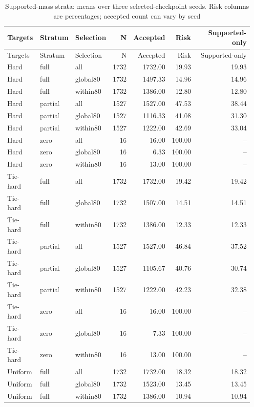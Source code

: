 \documentclass[10pt]{article}
\begin{document}
\begin{longtable}{lllrrrr}
\caption{Supported-mass strata: means over three selected-checkpoint seeds. Risk columns are percentages; accepted count can vary by seed}\\
\toprule Targets & Stratum & Selection & N & Accepted & Risk & Supported-only\\\midrule\endfirsthead
\toprule Targets & Stratum & Selection & N & Accepted & Risk & Supported-only\\\midrule\endhead
Hard & full & all & 1732 & 1732.00 & 19.93 & 19.93\\
Hard & full & global80 & 1732 & 1497.33 & 14.96 & 14.96\\
Hard & full & within80 & 1732 & 1386.00 & 12.80 & 12.80\\
Hard & partial & all & 1527 & 1527.00 & 47.53 & 38.44\\
Hard & partial & global80 & 1527 & 1116.33 & 41.08 & 31.30\\
Hard & partial & within80 & 1527 & 1222.00 & 42.69 & 33.04\\
Hard & zero & all & 16 & 16.00 & 100.00 & --\\
Hard & zero & global80 & 16 & 6.33 & 100.00 & --\\
Hard & zero & within80 & 16 & 13.00 & 100.00 & --\\
\addlinespace
Tie-hard & full & all & 1732 & 1732.00 & 19.42 & 19.42\\
Tie-hard & full & global80 & 1732 & 1507.00 & 14.51 & 14.51\\
Tie-hard & full & within80 & 1732 & 1386.00 & 12.33 & 12.33\\
Tie-hard & partial & all & 1527 & 1527.00 & 46.84 & 37.52\\
Tie-hard & partial & global80 & 1527 & 1105.67 & 40.76 & 30.74\\
Tie-hard & partial & within80 & 1527 & 1222.00 & 42.23 & 32.38\\
Tie-hard & zero & all & 16 & 16.00 & 100.00 & --\\
Tie-hard & zero & global80 & 16 & 7.33 & 100.00 & --\\
Tie-hard & zero & within80 & 16 & 13.00 & 100.00 & --\\
\addlinespace
Uniform & full & all & 1732 & 1732.00 & 18.32 & 18.32\\
Uniform & full & global80 & 1732 & 1523.00 & 13.45 & 13.45\\
Uniform & full & within80 & 1732 & 1386.00 & 10.94 & 10.94\\

\end{longtable}
\end{document}
